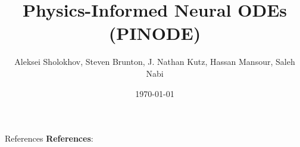 \documentclass[8pt]{beamer}
\title{Physics-Informed Neural ODEs (PINODE)}
\date{\today}
\author{Aleksei Sholokhov, Steven Brunton, J. Nathan Kutz, Hassan Mansour, Saleh Nabi }
\begin{document}
\maketitle



\begin{frame}{References}
	\textbf{References}: 
	
	
\end{frame}
\end{document}
